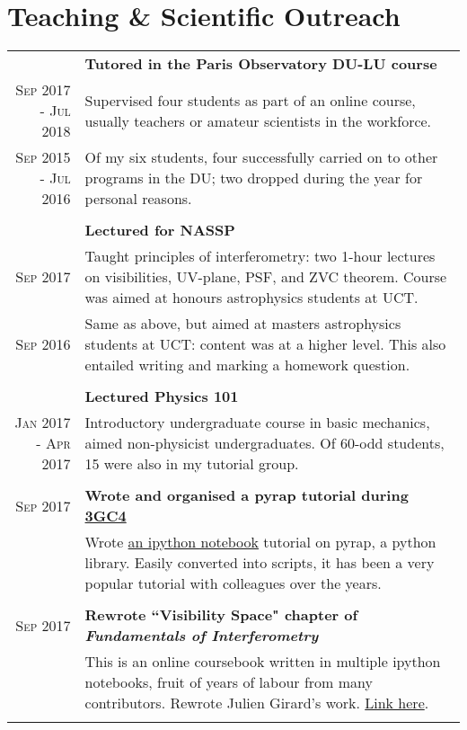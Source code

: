 \documentclass[10pt]{article} %
\begin{document}
\section{Teaching \& Scientific Outreach}
\hspace{-2cm}
\begin{tabular}{r|p{13.5cm}}
 & \textbf{Tutored in the Paris Observatory DU-LU course}\\
\textsc{Sep 2017 - Jul 2018} & Supervised four students as part of an online course, usually teachers or amateur scientists in the workforce.\\
\textsc{Sep 2015 - Jul 2016} & Of my six students, four successfully carried on to other programs in the DU; two dropped during the year for personal reasons.\\
\multicolumn{2}{c}{} \\


                  & \textbf{Lectured for NASSP}\\
\textsc{Sep 2017} & Taught principles of interferometry: two 1-hour lectures on visibilities, UV-plane, PSF, and ZVC theorem. Course was aimed at honours astrophysics students at UCT.\\
\textsc{Sep 2016} & Same as above, but aimed at masters astrophysics students at UCT: content was at a higher level. This also entailed writing and marking a homework question.\\
\multicolumn{2}{c}{} \\

                  & \textbf{Lectured Physics 101}\\
\textsc{Jan 2017 - Apr 2017} & Introductory undergraduate course in basic mechanics, aimed non-physicist undergraduates. Of 60-odd students, 15 were also in my tutorial group.\\
\multicolumn{2}{c}{} \\
\textsc{Sep 2017} & \textbf{Wrote and organised a pyrap tutorial during \hyperlink{http://www.ast.uct.ac.za/3gc4hifidelity/}{3GC4}}\\
                  & Wrote \hyperlink{https://github.com/ebonnassieux/Scripts/blob/master/PyrapTutorial.ipynb}{an ipython notebook} tutorial on pyrap, a python library. Easily converted into scripts, it has been a very popular tutorial with colleagues over the years.\\
\multicolumn{2}{c}{} \\
\textsc{Sep 2017} & \textbf{Rewrote ``Visibility Space" chapter of \emph{Fundamentals of Interferometry}}\\
                  & This is an online coursebook written in multiple ipython notebooks, fruit of years of labour from many contributors. Rewrote Julien Girard's work. \hyperlink{https://github.com/ratt-ru/fundamentals_of_interferometry}{Link here}.\\                  
\multicolumn{2}{c}{} \\


\end{tabular}
\end{document}
